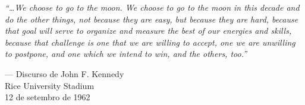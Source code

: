 \vspace*{\fill}

\noindent
\begin{minipage}{0.95\textwidth}
    {\Huge\itshape
    ``…We choose to go to the moon. We choose to go to the moon in this decade and do the other things, not because they are easy, but because they are hard, because that goal will serve to organize and measure the best of our energies and skills, because that challenge is one that we are willing to accept, one we are unwilling to postpone, and one which we intend to win, and the others, too.''}
\end{minipage}

\vspace{2cm}

\noindent
\begin{minipage}{0.95\textwidth}
    \raggedleft
    {\Large\color{gray}
    — Discurso de John F. Kennedy\\
    Rice University Stadium\\
    12 de setembro de 1962}
\end{minipage}

\vspace*{\fill}